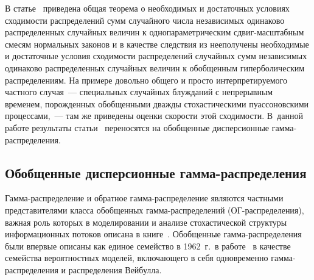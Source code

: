 \begin{multicols}{2}
В статье~\cite{Korolev2012b} приведена общая теорема о необходимых и
достаточных условиях сходимости распределений сумм случайного числа
независимых одинаково распределенных случайных величин к
однопараметрическим сдвиг-мас\-штаб\-ным смесям нормальных законов и в
качестве следствия из нее\linebreak получены необходимые и достаточные условия\linebreak
сходимости распределений случайных сумм независимых одинаково
распределенных случайных величин к обобщенным гиперболическим
распределениям. На примере довольно общего и просто
интерпретируемого частного случая~--- специальных случайных блужданий
с непрерывным временем, порожденных обобщенными дважды
стохастическими пуассоновскими процессами,~--- там же приведены
оценки скорости этой сходимости. В~данной работе результаты статьи~\cite{Korolev2012b} 
переносятся на обобщенные дисперсионные
гам\-ма-рас\-пре\-де\-ления.

\subsection{Обобщенные дисперсионные гамма-распределения}

Гамма-распределение и обратное гам\-ма-рас\-пре\-де\-ле\-ние являются частными
представителями класса обобщенных гам\-ма-рас\-пре\-де\-ле\-ний (ОГ-рас\-пре\-де\-ле\-ния), важная роль
которых в моделировании и анализе стохастической структуры
информационных потоков описана в книге~\cite{KorolevShorgin2011}.
Обобщенные гам\-ма-рас\-пре\-де\-ле\-ния были впервые
описаны как единое семейство в 1962~г.\ в работе~\cite{Stacy1962} в
качестве семейства вероятностных моделей, включающего в себя
одновременно гам\-ма-рас\-пре\-де\-ле\-ния и распределения Вейбулла.


\end{multicols}
